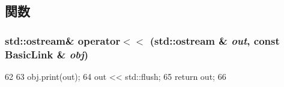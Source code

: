 \subsection{関数}
\hypertarget{BasicLink_8hh_a34beaf565f207efe9f7b985413212b48}{
\subsubsection[{operator$<$$<$}]{\setlength{\rightskip}{0pt plus 5cm}std::ostream\& operator$<$$<$ (std::ostream \& {\em out}, \/  const {\bf BasicLink} \& {\em obj})}}
\label{BasicLink_8hh_a34beaf565f207efe9f7b985413212b48}



\begin{DoxyCode}
62 {
63     obj.print(out);
64     out << std::flush;
65     return out;
66 }
\end{DoxyCode}
